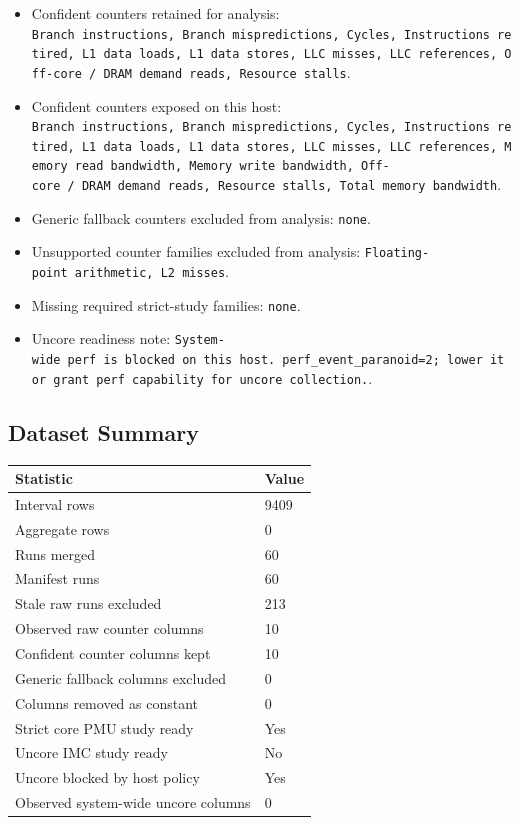 \documentclass[
]{article}
\providecommand{\tightlist}{%
  \setlength{\itemsep}{0pt}\setlength{\parskip}{0pt}}
\begin{document}
\begin{itemize}
\tightlist
\item
  Confident counters retained for analysis:
  \texttt{Branch\ instructions,\ Branch\ mispredictions,\ Cycles,\ Instructions\ retired,\ L1\ data\ loads,\ L1\ data\ stores,\ LLC\ misses,\ LLC\ references,\ Off-core\ /\ DRAM\ demand\ reads,\ Resource\ stalls}.
\item
  Confident counters exposed on this host:
  \texttt{Branch\ instructions,\ Branch\ mispredictions,\ Cycles,\ Instructions\ retired,\ L1\ data\ loads,\ L1\ data\ stores,\ LLC\ misses,\ LLC\ references,\ Memory\ read\ bandwidth,\ Memory\ write\ bandwidth,\ Off-core\ /\ DRAM\ demand\ reads,\ Resource\ stalls,\ Total\ memory\ bandwidth}.
\item
  Generic fallback counters excluded from analysis: \texttt{none}.
\item
  Unsupported counter families excluded from analysis:
  \texttt{Floating-point\ arithmetic,\ L2\ misses}.
\item
  Missing required strict-study families: \texttt{none}.
\item
  Uncore readiness note:
  \texttt{System-wide\ perf\ is\ blocked\ on\ this\ host.\ perf\_event\_paranoid=2;\ lower\ it\ or\ grant\ perf\ capability\ for\ uncore\ collection.}.
\end{itemize}

\hypertarget{dataset-summary}{%
\subsection{Dataset Summary}\label{dataset-summary}}

\begin{longtable}[]{@{}ll@{}}
\toprule
Statistic & Value \\
\midrule
\endhead
Interval rows & 9409 \\
Aggregate rows & 0 \\
Runs merged & 60 \\
Manifest runs & 60 \\
Stale raw runs excluded & 213 \\
Observed raw counter columns & 10 \\
Confident counter columns kept & 10 \\
Generic fallback columns excluded & 0 \\
Columns removed as constant & 0 \\
Strict core PMU study ready & Yes \\
Uncore IMC study ready & No \\
Uncore blocked by host policy & Yes \\
Observed system-wide uncore columns & 0 \\
\bottomrule
\end{longtable}
\end{document}
